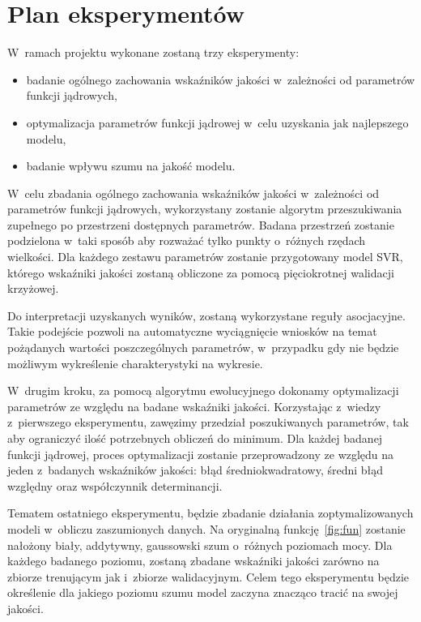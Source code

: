 \section{Plan eksperymentów}
W~ramach projektu wykonane zostaną trzy eksperymenty:
\begin{itemize}
    \item badanie ogólnego zachowania wskaźników jakości w~zależności od parametrów funkcji jądrowych,
    \item optymalizacja parametrów funkcji jądrowej w~celu uzyskania jak najlepszego modelu,
    \item badanie wpływu szumu na jakość modelu.
\end{itemize}

W~celu zbadania ogólnego zachowania wskaźników jakości w~zależności od parametrów funkcji jądrowych, wykorzystany zostanie algorytm przeszukiwania zupełnego po przestrzeni dostępnych parametrów. Badana przestrzeń zostanie podzielona w~taki sposób aby rozważać tylko punkty o~różnych rzędach wielkości. Dla każdego zestawu parametrów zostanie przygotowany model SVR, którego wskaźniki jakości zostaną obliczone za pomocą pięciokrotnej walidacji krzyżowej.

Do interpretacji uzyskanych wyników, zostaną wykorzystane reguły asocjacyjne. Takie podejście pozwoli na automatyczne wyciągnięcie wniosków na temat pożądanych wartości poszczególnych parametrów, w~przypadku gdy nie będzie możliwym wykreślenie charakterystyki na wykresie.

W~drugim kroku, za pomocą algorytmu ewolucyjnego dokonamy optymalizacji parametrów ze względu na badane wskaźniki jakości. Korzystając z~wiedzy z~pierwszego eksperymentu, zawęzimy przedział poszukiwanych parametrów, tak aby ograniczyć ilość potrzebnych obliczeń do minimum. Dla każdej badanej funkcji jądrowej, proces optymalizacji zostanie przeprowadzony ze względu na jeden z~badanych wskaźników jakości: błąd średniokwadratowy, średni błąd względny oraz współczynnik determinancji.

Tematem ostatniego eksperymentu, będzie zbadanie działania zoptymalizowanych modeli w~obliczu zaszumionych danych. Na oryginalną funkcję~\ref{fig:fun} zostanie nałożony biały, addytywny, gaussowski szum o~różnych poziomach mocy. Dla każdego badanego poziomu, zostaną zbadane wskaźniki jakości zarówno na zbiorze trenującym jak i~zbiorze walidacyjnym. Celem tego eksperymentu będzie określenie dla jakiego poziomu szumu model zaczyna znacząco tracić na swojej jakości.